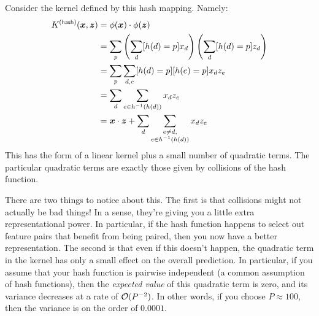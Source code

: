 Consider the kernel defined by this hash mapping.  Namely:
%
\begin{align}
  K\xth{hash}(\vx, \vz) 
  &=
  \dotp{\phi(\vx)}{\phi(\vz)} \\
  &=
  \sum_p \left( \sum_d [h(d) = p] x_d \right) \left( \sum_d [h(d) = p] z_d \right)\\
  &=
  \sum_p \sum_{d,e} [h(d) = p] [h(e) = p] x_d z_e \\
  &=
  \sum_d \sum_{e \in h\inv(h(d))} x_d z_e \\
  &=
  \dotp{\vx}{\vz} + \sum_d \sum_{\substack{e \neq d,\\e \in h\inv(h(d))}} x_d z_e
\end{align}
%
This  has the form of a linear kernel plus a
small number of quadratic terms.  The particular quadratic terms are
exactly those given by collisions of the hash function.

There are two things to notice about this.  The first is that
collisions might not actually be bad things!  In a sense, they're
giving you a little extra representational power.  In particular, if
the hash function happens to select out feature pairs that benefit
from being paired, then you now have a better representation.  The
second is that even if this doesn't happen, the quadratic term in the
kernel has only a small effect on the overall prediction.  In
particular, if you assume that your hash function is pairwise
independent (a common assumption of hash functions), then the
\emph{expected value} of this quadratic term is zero, and its variance
decreases at a rate of $\mathcal{O}(P^{-2})$.  In other words, if you choose
$P \approx 100$, then the variance is on the order of $0.0001$.


\begin{comment}
already know (sub)GD from loss.tex
talk about stochastic (sub)GD
formal optimization and duals
hashing tricks
sparsity
\end{comment}

\begin{exercises}
\begin{Ex}
\TODO

\begin{solution}
\TODO
\end{solution}
\end{Ex}

\end{exercises}

